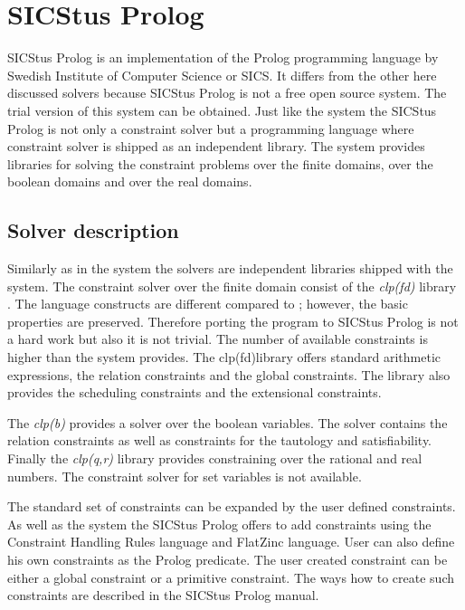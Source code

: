 \section{SICStus Prolog}

SICStus Prolog is an implementation of the Prolog programming language by Swedish
Institute of Computer Science or SICS. It differs from the other here discussed solvers 
because SICStus Prolog is not a free open source system. The trial version of this
system can be obtained. Just like the \eclipse system the SICStus Prolog is not only
a constraint solver but a programming language where constraint solver is shipped as 
an independent library. The system provides libraries for solving the constraint problems
over the finite domains, over the boolean domains and over the real domains.

\subsection{Solver description}
Similarly as in the \eclipse system the solvers are independent libraries shipped 
with the system. The constraint solver over the finite domain consist of the
{\em clp(fd)} library \cite{Carlsson97anopen-ended}. The language constructs are different
compared to \eclipse; however, the basic properties are preserved. Therefore porting
the \eclipse program to SICStus Prolog is not a hard work but also it is not trivial.
The number of available constraints is higher than the \eclipse system provides.
The clp(fd)library offers standard arithmetic expressions, the relation constraints
and the global constraints. The library also provides the scheduling constraints and 
the extensional constraints.

The {\em clp(b)} provides a solver over the boolean variables. The solver contains
the relation constraints as well as constraints for the tautology and satisfiability.
Finally the {\em clp(q,r)} library \cite{clpqr:opai} provides constraining over the 
rational and real numbers. The constraint solver for set variables is not available.

The standard set of constraints can be expanded by the user defined constraints. As well as the
\eclipse system the SICStus Prolog offers to add constraints using the Constraint Handling
Rules language and FlatZinc language. User can also define his own constraints as the
Prolog predicate. The user created constraint can be either a global constraint or
a primitive constraint. The ways how to create such constraints are described in 
the SICStus Prolog manual.

